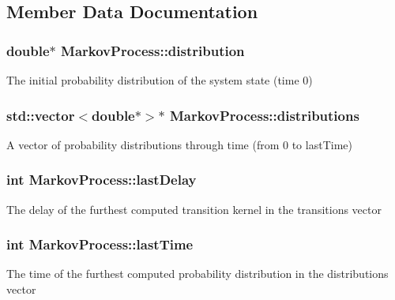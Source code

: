 \subsection{Member Data Documentation}
\hypertarget{class_markov_process_ab08fd1641b1f866be6a7e3dcca7ed575}{}
\subsubsection[{distribution}]{\setlength{\rightskip}{0pt plus 5cm}double$\ast$ Markov\+Process\+::distribution}\label{class_markov_process_ab08fd1641b1f866be6a7e3dcca7ed575}
The initial probability distribution of the system state (time 0) \hypertarget{class_markov_process_a8e5ced320dd6b0a41c2f38f316c37cbf}{}
\subsubsection[{distributions}]{\setlength{\rightskip}{0pt plus 5cm}std\+::vector$<$double$\ast$$>$$\ast$ Markov\+Process\+::distributions}\label{class_markov_process_a8e5ced320dd6b0a41c2f38f316c37cbf}
A vector of probability distributions through time (from 0 to last\+Time) \hypertarget{class_markov_process_a5fa10a819200afd87b558332b6e351a6}{}
\subsubsection[{last\+Delay}]{\setlength{\rightskip}{0pt plus 5cm}int Markov\+Process\+::last\+Delay}\label{class_markov_process_a5fa10a819200afd87b558332b6e351a6}
The delay of the furthest computed transition kernel in the transitions vector \hypertarget{class_markov_process_a5eddf681cb7bc196a248813ba42b516f}{}
\subsubsection[{last\+Time}]{\setlength{\rightskip}{0pt plus 5cm}int Markov\+Process\+::last\+Time}\label{class_markov_process_a5eddf681cb7bc196a248813ba42b516f}
The time of the furthest computed probability distribution in the distributions vector \hypertarget{class_markov_process_ad38170c3a73d113dc152e73bc57d0523}{}

